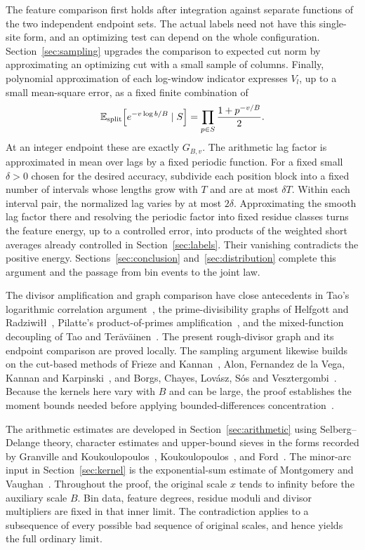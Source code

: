 The feature comparison first holds after integration against separate
functions of the two independent endpoint sets.  The actual labels need
not have this single-site form, and an optimizing test can depend on the
whole configuration.  Section~\ref{sec:sampling} upgrades the comparison
to expected cut norm by approximating an optimizing cut with a small sample
of columns.  Finally,
polynomial approximation of each log-window indicator expresses $V_l$,
up to a small mean-square error, as a fixed finite combination of
\[
 \mathbb E_{\rm split}\!\left[e^{-v\log b/B}\mid S\right]
       =\prod_{p\in S}\frac{1+p^{-v/B}}2.
\]
At an integer endpoint these are exactly $G_{B,v}$.  The arithmetic lag
factor is approximated in mean over lags by a fixed periodic function.
For a fixed small $\delta>0$ chosen for the desired accuracy, subdivide each
position block into a fixed number of intervals whose lengths grow with
$T$ and are at most $\delta T$.  Within each interval pair, the normalized
lag varies by at most $2\delta$.  Approximating the smooth lag factor there
and resolving the periodic factor into fixed residue classes turns the
feature energy, up to a controlled error, into products of the weighted
short averages already controlled in Section~\ref{sec:labels}.  Their vanishing
contradicts the positive energy.  Sections~\ref{sec:conclusion}
and~\ref{sec:distribution} complete this argument and the passage from bin
events to the joint law.

The divisor amplification and graph comparison have close antecedents in
Tao's logarithmic correlation argument~\cite{Tao2016LogChowla}, the
prime-divisibility graphs of Helfgott and
Radziwi\l\l~\cite{HelfgottRadziwill2021}, Pilatte's product-of-primes
amplification~\cite{Pilatte2023}, and the mixed-function decoupling of
Tao and Ter\"av\"ainen~\cite[Section~3.1]{TaoTeravainen2026Quantitative}.
The present rough-divisor graph and its endpoint comparison are proved
locally.  The sampling argument likewise builds on the cut-based methods
of Frieze and Kannan~\cite{FriezeKannan1999}, Alon, Fernandez de la Vega,
Kannan and Karpinski~\cite[Lemma~3]{AlonEtAl2003Sampling}, and Borgs,
Chayes, Lov\'asz, S\'os and
Vesztergombi~\cite[Theorem~4.6]{BorgsEtAl2008}.  Because the kernels here
vary with $B$ and can be large, the proof establishes the moment bounds
needed before applying bounded-differences concentration~\cite{McDiarmid1989}.

The arithmetic estimates are developed in Section~\ref{sec:arithmetic}
using Selberg--Delange theory, character estimates and upper-bound sieves
in the forms recorded by Granville and
Koukoulopoulos~\cite{GranvilleKoukoulopoulos2019},
Koukoulopoulos~\cite{Koukoulopoulos2019}, and
Ford~\cite{FordSieve2023,FordZeta2022}.  The minor-arc input in
Section~\ref{sec:kernel} is the exponential-sum estimate of Montgomery and
Vaughan~\cite{MontgomeryVaughan1977}.  Throughout the proof, the original
scale $x$ tends to infinity before the auxiliary scale $B$.  Bin data,
feature degrees, residue moduli and divisor multipliers are fixed in that
inner limit.  The contradiction applies to a subsequence of every possible
bad sequence of original scales, and hence yields the full ordinary limit.
